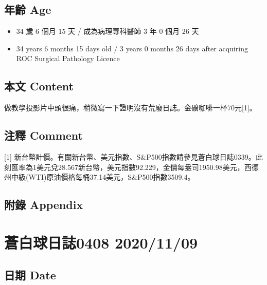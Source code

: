 \documentclass[a5paper, 11pt
]{book}
\providecommand{\tightlist}{%
  \setlength{\itemsep}{0pt}\setlength{\parskip}{0pt}}
\begin{document}
\hypertarget{ux5e74ux9f61-age-63}{%
\subsection{年齡 Age}\label{ux5e74ux9f61-age-63}}

\begin{itemize}
\tightlist
\item
  34 歲 6 個月 15 天 / 成為病理專科醫師 3 年 0 個月 26 天
\item
  34 years 6 months 15 days old / 3 years 0 months 26 days after
  acquiring ROC Surgical Pathology Licence
\end{itemize}

\hypertarget{ux672cux6587-content-63}{%
\subsection{本文 Content}\label{ux672cux6587-content-63}}

做教學投影片中頭很痛，稍微寫一下證明沒有荒廢日誌。金礦咖啡一杯70元{[}1{]}。

\hypertarget{ux6ce8ux91cb-comment-63}{%
\subsection{注釋 Comment}\label{ux6ce8ux91cb-comment-63}}

{[}1{]}
新台幣計價。有關新台幣、美元指數、S\&P500指數請參見蒼白球日誌0339。此刻匯率為1美元兌28.567新台幣，美元指數92.229，金價每盎司1950.98美元，西德州中級(WTI)原油價格每桶37.14美元，S\&P500指數3509.4。

\hypertarget{ux9644ux9304-appendix-63}{%
\subsection{附錄 Appendix}\label{ux9644ux9304-appendix-63}}

\hypertarget{ux84bcux767dux7403ux65e5ux8a8c0408-20201109}{%
\section{蒼白球日誌0408
2020/11/09}\label{ux84bcux767dux7403ux65e5ux8a8c0408-20201109}}

\hypertarget{ux65e5ux671f-date-64}{%
\subsection{日期 Date}\label{ux65e5ux671f-date-64}}
\end{document}
